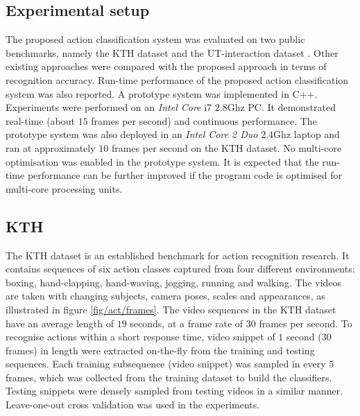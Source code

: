 \subsection{Experimental setup} 

The proposed action classification system was evaluated on two public benchmarks, namely the KTH dataset \cite{Schuldt2004} and the UT-interaction dataset \cite{Ryoo2010}. 
Other existing approaches were compared with the proposed approach in terms of recognition accuracy. 
Run-time performance of the proposed action classification system was also reported. A prototype system was implemented in C++. Experiments were performed on an \emph{Intel Core}\texttrademark \; i7 $2.8$Ghz PC. It demonstrated real-time (about $15$ frames per second) and continuous performance. 
The prototype system was also deployed in an \emph{Intel Core 2 Duo} $2.4$Ghz laptop and ran at approximately $10$ frames per second on the KTH dataset. 
No multi-core optimisation was enabled in the prototype system. It is expected that the run-time performance can be further improved if the program code is optimised for multi-core processing units.



\subsection{KTH}

The KTH dataset is an established benchmark for action recognition research. 
It contains sequences of six action classes captured from four different environments: boxing, hand-clapping, hand-waving, jogging, running and walking. 
The videos are taken with changing subjects, camera poses, scales and appearances, as illustrated in figure \ref{fig/act/frames}. 
The video sequences in the KTH dataset have an average length of $19$ seconds, at a frame rate of $30$ frames per second. 
To recognise actions within a short response time, video snippet of $1$ second ($30$ frames) in length were extracted on-the-fly from the training and testing sequences. 
Each training subsequence (video snippet) was sampled in every $5$ frames, which was collected from the training dataset to build the classifiers. 
Testing snippets were densely sampled from testing videos in a similar manner. 
Leave-one-out cross validation was used in the experiments. 

